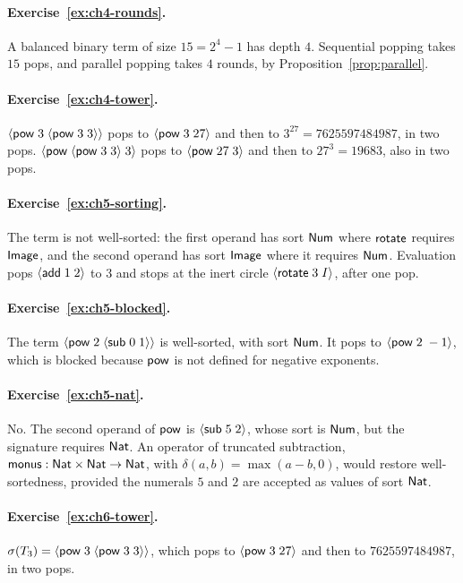 \paragraph{Exercise~\ref{ex:ch4-rounds}.}
A balanced binary term of size $15=2^{4}-1$ has depth $4$. Sequential popping takes $15$ pops, and parallel popping takes $4$ rounds, by Proposition~\ref{prop:parallel}.

\paragraph{Exercise~\ref{ex:ch4-tower}.}
$\langle \mathsf{pow}\; 3\; \langle \mathsf{pow}\; 3\; 3\rangle\rangle$ pops to $\langle \mathsf{pow}\; 3\; 27\rangle$ and then to $3^{27}=7625597484987$, in two pops. $\langle \mathsf{pow}\; \langle \mathsf{pow}\; 3\; 3\rangle\; 3\rangle$ pops to $\langle \mathsf{pow}\; 27\; 3\rangle$ and then to $27^{3}=19683$, also in two pops.

\paragraph{Exercise~\ref{ex:ch5-sorting}.}
The term is not well-sorted: the first operand has sort $\mathsf{Num}$ where $\mathsf{rotate}$ requires $\mathsf{Image}$, and the second operand has sort $\mathsf{Image}$ where it requires $\mathsf{Num}$. Evaluation pops $\langle \mathsf{add}\; 1\; 2\rangle$ to $3$ and stops at the inert circle $\langle \mathsf{rotate}\; 3\; I\rangle$, after one pop.

\paragraph{Exercise~\ref{ex:ch5-blocked}.}
The term $\langle \mathsf{pow}\; 2\; \langle \mathsf{sub}\; 0\; 1\rangle\rangle$ is well-sorted, with sort $\mathsf{Num}$. It pops to $\langle \mathsf{pow}\; 2\; -1\rangle$, which is blocked because $\mathsf{pow}$ is not defined for negative exponents.

\paragraph{Exercise~\ref{ex:ch5-nat}.}
No. The second operand of $\mathsf{pow}$ is $\langle \mathsf{sub}\; 5\; 2\rangle$, whose sort is $\mathsf{Num}$, but the signature requires $\mathsf{Nat}$. An operator of truncated subtraction, $\mathsf{monus}:\mathsf{Nat}\times\mathsf{Nat}\to\mathsf{Nat}$, with $\delta(a,b)=\max(a-b,0)$, would restore well-sortedness, provided the numerals $5$ and $2$ are accepted as values of sort $\mathsf{Nat}$.

\paragraph{Exercise~\ref{ex:ch6-tower}.}
$\sigma(T_3)=\langle \mathsf{pow}\; 3\; \langle \mathsf{pow}\; 3\; 3\rangle\rangle$, which pops to $\langle \mathsf{pow}\; 3\; 27\rangle$ and then to $7625597484987$, in two pops.

